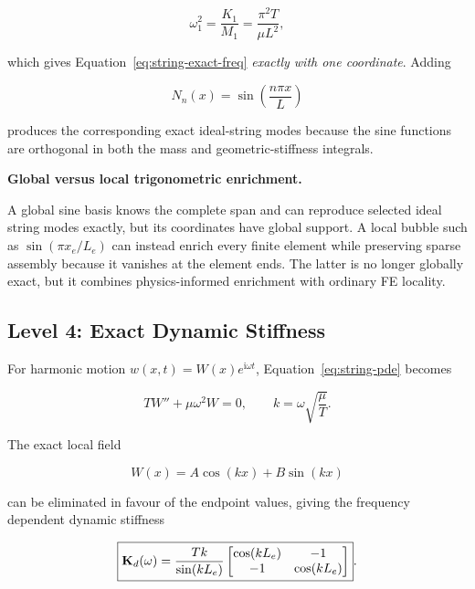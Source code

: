 \begin{equation}
    \omega_1^2=\frac{K_1}{M_1}
    =\frac{\pi^2T}{\mu L^2},
\end{equation}

which gives Equation~\eqref{eq:string-exact-freq} \emph{exactly with one
coordinate}.  Adding

\begin{equation}
    N_n(x)=\sin\left(\frac{n\pi x}{L}\right)
\end{equation}

produces the corresponding exact ideal-string modes because the sine functions
are orthogonal in both the mass and geometric-stiffness integrals.

\begin{bbox}
\textbf{Global versus local trigonometric enrichment.}

A global sine basis knows the complete span and can reproduce selected ideal
string modes exactly, but its coordinates have global support.  A local bubble
such as $\sin(\pi x_e/L_e)$ can instead enrich every finite element while
preserving sparse assembly because it vanishes at the element ends.  The latter
is no longer globally exact, but it combines physics-informed enrichment with
ordinary FE locality.
\end{bbox}

\subsection{Level 4: Exact Dynamic Stiffness}

For harmonic motion $w(x,t)=W(x)e^{\mathrm{i}\omega t}$,
Equation~\eqref{eq:string-pde} becomes

\begin{equation}
    T W''+\mu\omega^2 W=0,
    \qquad
    k=\omega\sqrt{\frac{\mu}{T}}.
\end{equation}

The exact local field

\begin{equation}
    W(x)=A\cos(kx)+B\sin(kx)
\end{equation}

can be eliminated in favour of the endpoint values, giving the
frequency dependent dynamic stiffness

\begin{equation}\label{eq:string-dynamic-stiffness}
    \boxed{
    \mathbf{K}_d(\omega)
    =\frac{Tk}{\sin(kL_e)}
    \begin{bmatrix}
        \cos(kL_e)&-1\\
        -1&\cos(kL_e)
    \end{bmatrix}
    }.
\end{equation}

